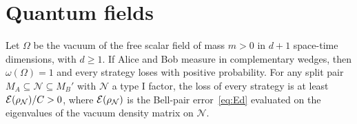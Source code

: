 \section{Quantum fields}\label{sec:qft}

\begin{corollary}\label{cor:qft}
Let $\Omega$ be the vacuum of the free scalar field of mass $m>0$ in $d+1$ space-time
dimensions, with $d\ge1$. If Alice and Bob measure in complementary wedges, then
$\omega(\Omega)=1$ and every strategy loses with positive probability. For any split pair
$M_A\subseteq\mathcal N\subseteq M_B'$ with $\mathcal N$ a type I factor, the loss of every
strategy is at least $\mathcal{E}(\rho_{\mathcal N})/C>0$, where $\mathcal{E}(\rho_{\mathcal N})$ is the
Bell-pair error~\eqref{eq:Ed} evaluated on the eigenvalues of the vacuum density matrix on
$\mathcal N$.
\end{corollary}

